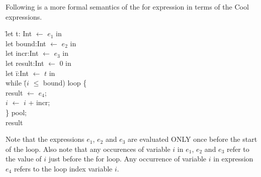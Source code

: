 \documentclass{article}
\begin{document}
\begin{enumerate}
Following is a more formal semantics of the for expression in terms of the Cool
expressions. 
\begin{tabbing}
  \hspace*{3mm} \= let t: Int $\leftarrow$ $e_1$ in \\
  \> let bound:Int  $\leftarrow$ $e_2$ in \\
  \> let incr:Int  $\leftarrow$ $e_3$ in \\
  \> let result:Int  $\leftarrow$ $0$ in \\
  \> let \= i:Int $\leftarrow$ $t$ in   \\
   \>  \> while \= ($i$ $\leq$ bound) loop \{ \\
     \>\>\>   result $\leftarrow$ $e_4$; \\
\> \> \> $i$ $\leftarrow$ $i$ + incr; \\
     \> \> \} pool; \\
     \> \> result  \\
\end{tabbing}

Note that the expressions $e_1$, $e_2$ and $e_3$ are evaluated ONLY once before the start of the loop.
Also note that any occurences of variable $i$ in $e_1$, $e_2$ and
$e_3$ refer to the value of $i$ 
just before the for loop.
Any occurrence of variable $i$ in expression $e_4$ refers to the loop index variable $i$.


\end{enumerate}
\end{document}
